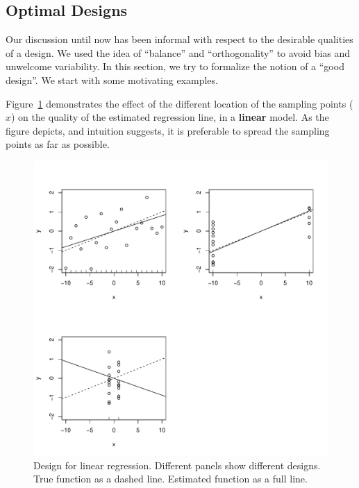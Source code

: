 \subsection{Optimal Designs}


Our discussion until now has been informal with respect to the desirable qualities of a design. 
We used the idea of ``balance'' and ``orthogonality'' to avoid bias and unwelcome variability.
In this section, we try to formalize the notion of a ``good design''.
We start with some motivating examples.

\begin{example}
\label{eg:design_linear}
Figure~\ref{fig:design_linear} demonstrates the effect of the different location of the sampling points ($x$) on the quality of the estimated regression line, in a \textbf{linear} model.
As the figure depicts, and intuition suggests, it is preferable to spread the sampling points as far as possible.
\begin{figure}[ht]
\centering
\includegraphics[height=0.3\textheight]{art/linear}
\caption[Design for Linear Models]{Design for linear regression. Different panels show different designs. True function as a dashed line. Estimated function as a full line.}
\label{fig:design_linear}
\end{figure}
\end{example}





